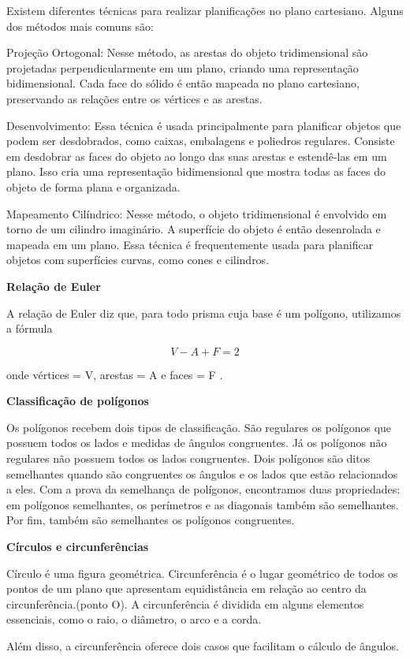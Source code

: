 Existem diferentes técnicas para realizar planificações no plano
cartesiano. Alguns dos métodos mais comuns são:

Projeção Ortogonal: Nesse método, as arestas do objeto tridimensional
são projetadas perpendicularmente em um plano, criando uma representação
bidimensional. Cada face do sólido é então mapeada no plano cartesiano,
preservando as relações entre os vértices e as arestas.

Desenvolvimento: Essa técnica é usada principalmente para planificar
objetos que podem ser desdobrados, como caixas, embalagens e poliedros
regulares. Consiste em desdobrar as faces do objeto ao longo das suas
arestas e estendê-las em um plano. Isso cria uma representação
bidimensional que mostra todas as faces do objeto de forma plana e
organizada.

Mapeamento Cilíndrico: Nesse método, o objeto tridimensional é envolvido
em torno de um cilindro imaginário. A superfície do objeto é então
desenrolada e mapeada em um plano. Essa técnica é frequentemente usada
para planificar objetos com superfícies curvas, como cones e cilindros.

\textbf{Relação de Euler}

A relação de Euler diz que, para todo prisma cuja base é um polígono,
utilizamos a fórmula

$$V - A + F = 2$$

onde vértices = V, arestas = A e faces = F .

\textbf{Classificação de polígonos~}

Os polígonos recebem dois tipos de classificação. São regulares os
polígonos que possuem todos os lados e medidas de ângulos congruentes.
Já os polígonos não regulares não possuem todos os lados congruentes.
Dois polígonos são ditos semelhantes quando são congruentes os ângulos e
os lados que estão relacionados a eles. Com a prova da semelhança de
polígonos, encontramos duas propriedades: em polígonos semelhantes, os
perímetros e as diagonais também são semelhantes. Por fim, também são
semelhantes os polígonos congruentes.~

\textbf{Círculos e circunferências~}

Círculo é uma figura geométrica. Circunferência é o lugar geométrico de
todos os pontos de um plano que apresentam equidistância em relação ao
centro da circunferência.(ponto O). A circunferência é dividida em
alguns elementos essenciais, como o raio, o diâmetro, o arco e a corda.

Além disso, a circunferência oferece dois casos que facilitam o cálculo
de ângulos.


